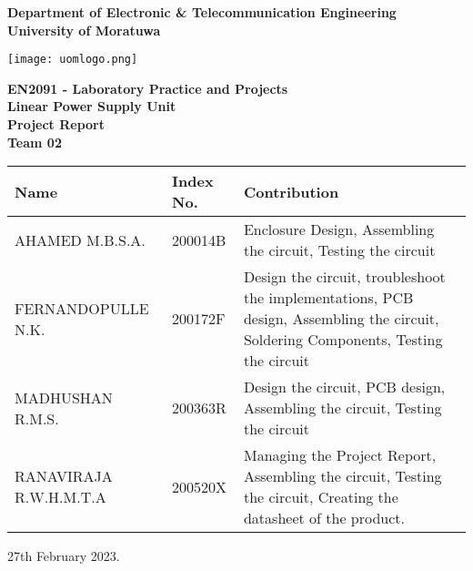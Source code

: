 \documentclass[11pt,a4paper]{article}
\begin{document}
\begin{titlepage}



\vspace{-0.5in}
\begin{center}
\textbf{\Large{Department of Electronic \& Telecommunication Engineering \\University of Moratuwa}}\\
\vspace{0.5in}

\texttt{[image: uomlogo.png]}\\
\vspace{0.5in}

\textbf{\Large{EN2091 - Laboratory Practice and Projects}}\\
\vspace{0.45in}
\textbf{\Large{Linear Power Supply Unit}}\\
\vspace{0.1in}
\textbf{\Large{Project Report}}\\
\vspace{0.1in}
\textbf{Team 02}\\
\end{center}

\begin{center}
\renewcommand{\arraystretch}{1.5}
\begin{tabular}{|m{45mm}| m{15mm}|m{80mm}|} 
\hline
\textbf{Name} & \textbf{Index No.} & \textbf{Contribution} \\ \hline
AHAMED M.B.S.A. & 200014B & Enclosure Design, Assembling the circuit, Testing the circuit \\ \hline
FERNANDOPULLE N.K. & 200172F & Design the circuit, troubleshoot the implementations, PCB design, Assembling the   circuit, Soldering Components, Testing the circuit \\ \hline
MADHUSHAN R.M.S. & 200363R & Design the circuit, PCB design, Assembling the circuit, Testing the circuit  \\ \hline
RANAVIRAJA   R.W.H.M.T.A & 200520X & Managing   the Project Report, Assembling the circuit, Testing the circuit, Creating the   datasheet of the product. \\ \hline
\end{tabular}
\end{center}


\begin{center}
    \large{27th February 2023.}
\end{center}

\end{titlepage}
\end{document}
